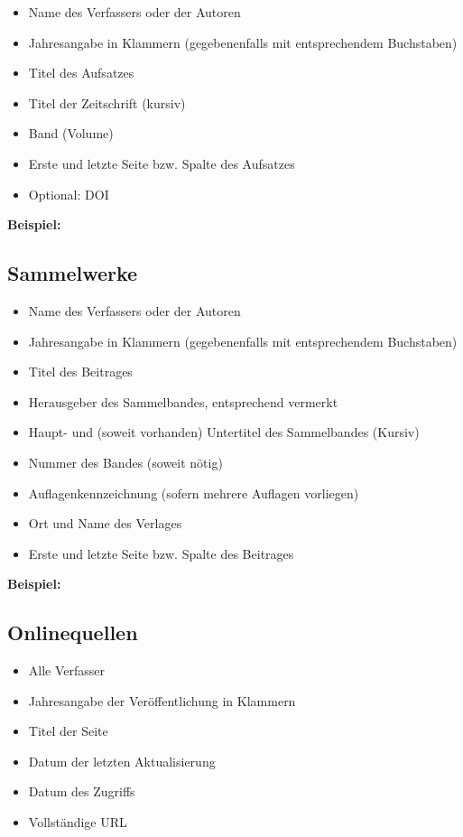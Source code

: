 \documentclass[a4paper,12pt]{scrartcl} %
\begin{document}
\begin{itemize}
\item Name des Verfassers oder der Autoren
\item Jahresangabe in Klammern (gegebenenfalls mit entsprechendem Buchstaben)
\item Titel des Aufsatzes
\item Titel der Zeitschrift (kursiv)
\item Band (Volume)
\item Erste und letzte Seite bzw. Spalte des Aufsatzes
\item Optional: DOI
\end{itemize}

\textbf{Beispiel:}

\subsection{Sammelwerke}

\begin{itemize}
\item Name des Verfassers oder der Autoren
\item Jahresangabe in Klammern (gegebenenfalls mit entsprechendem Buchstaben)
\item Titel des Beitrages
\item Herausgeber des Sammelbandes, entsprechend vermerkt
\item Haupt- und (soweit vorhanden) Untertitel des Sammelbandes (Kursiv)
\item Nummer des Bandes (soweit nötig)
\item Auflagenkennzeichnung (sofern mehrere Auflagen vorliegen)
\item Ort und Name des Verlages
\item Erste und letzte Seite bzw. Spalte des Beitrages
\end{itemize}

\textbf{Beispiel:}

\subsection{Onlinequellen}

\begin{itemize}
\item Alle Verfasser
\item Jahresangabe der Veröffentlichung in Klammern
\item Titel der Seite
\item Datum der letzten Aktualisierung
\item Datum des Zugriffs
\item Vollständige URL
\end{itemize}
\end{document}
